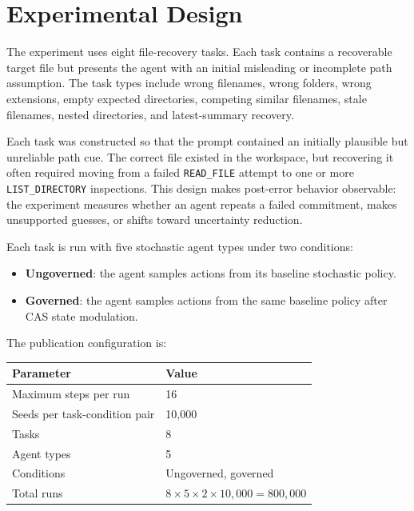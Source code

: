 \documentclass[11pt]{article}
\begin{document}
\section{Experimental Design}

The experiment uses eight file-recovery tasks. Each task contains a recoverable target file but presents the agent with an initial misleading or incomplete path assumption. The task types include wrong filenames, wrong folders, wrong extensions, empty expected directories, competing similar filenames, stale filenames, nested directories, and latest-summary recovery.

Each task was constructed so that the prompt contained an initially plausible but unreliable path cue. The correct file existed in the workspace, but recovering it often required moving from a failed \texttt{READ\_FILE} attempt to one or more \texttt{LIST\_DIRECTORY} inspections. This design makes post-error behavior observable: the experiment measures whether an agent repeats a failed commitment, makes unsupported guesses, or shifts toward uncertainty reduction.

Each task is run with five stochastic agent types under two conditions:

\begin{itemize}[leftmargin=1.5em]
    \item \textbf{Ungoverned}: the agent samples actions from its baseline stochastic policy.
    \item \textbf{Governed}: the agent samples actions from the same baseline policy after CAS state modulation.
\end{itemize}

The publication configuration is:

\begin{center}
\begin{tabular}{ll}
\toprule
\textbf{Parameter} & \textbf{Value} \\
\midrule
Maximum steps per run & 16 \\
Seeds per task-condition pair & 10,000 \\
Tasks & 8 \\
Agent types & 5 \\
Conditions & Ungoverned, governed \\
Total runs & $8 \times 5 \times 2 \times 10{,}000 = 800{,}000$ \\
\bottomrule
\end{tabular}
\end{center}
\end{document}
